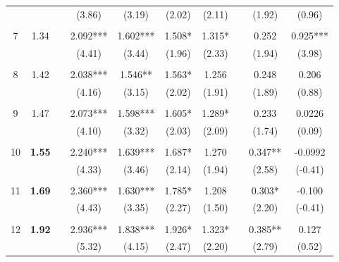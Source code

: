 \documentclass[12pt]{amsart}
\begin{document}
\begin{table}[htbp]
{\begin{tabular}{cccccccccc}
          &       &       & (3.86) & (3.19) & (2.02) & (2.11) &       & (1.92) & (0.96) \\
          &       &       &       &       &       &       &       &       &  \\
    7     & 1.34  &       & 2.092*** & 1.602*** & 1.508* & 1.315* &       & 0.252 & 0.925*** \\
          &       &       & (4.41) & (3.44) & (1.96) & (2.33) &       & (1.94) & (3.98) \\
          &       &       &       &       &       &       &       &       &  \\
    8     & 1.42  &       & 2.038*** & 1.546** & 1.563* & 1.256 &       & 0.248 & 0.206 \\
          &       &       & (4.16) & (3.15) & (2.02) & (1.91) &       & (1.89) & (0.88) \\
          &       &       &       &       &       &       &       &       &  \\
    9     & 1.47  &       & 2.073*** & 1.598*** & 1.605* & 1.289* &       & 0.233 & 0.0226 \\
          &       &       & (4.10) & (3.32) & (2.03) & (2.09) &       & (1.74) & (0.09) \\
          &       &       &       &       &       &       &       &       &  \\
    10    & \textbf{1.55} &       & 2.240*** & 1.639*** & 1.687* & 1.270 &       & 0.347** & -0.0992 \\
          &       &       & (4.33) & (3.46) & (2.14) & (1.94) &       & (2.58) & (-0.41) \\
          &       &       &       &       &       &       &       &       &  \\
    11    & \textbf{1.69} &       & 2.360*** & 1.630*** & 1.785* & 1.208 &       & 0.303* & -0.100 \\
          &       &       & (4.43) & (3.35) & (2.27) & (1.50) &       & (2.20) & (-0.41) \\
          &       &       &       &       &       &       &       &       &  \\
    12    & \textbf{1.92} &       & 2.936*** & 1.838*** & 1.926* & 1.323* &       & 0.385** & 0.127 \\
          &       &       & (5.32) & (4.15) & (2.47) & (2.20) &       & (2.79) & (0.52) \\
          \hline\hline
    \end{tabular}%
    }
  \label{tab:leifheitrepcases}%
\end{table}%
\end{document}
